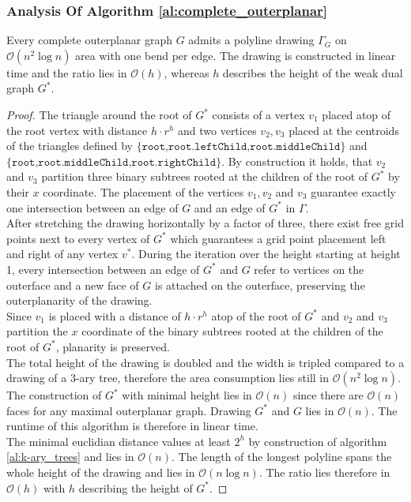 \subsubsection{Analysis Of Algorithm \ref{al:complete_outerplanar}}

\begin{lemma}
	Every complete outerplanar graph $G$ admits a polyline drawing $\Gamma_G$ on $\mathcal{O}(n^2 \log n)$ area with one bend per edge. The drawing is constructed in linear time and the ratio lies in $\mathcal{O}(h)$, whereas $h$ describes the height of the weak dual graph $G^*$.
\end{lemma}

\begin{proof}
The triangle around the root of $G^*$ consists of a vertex $v_1$ placed atop of the root vertex with distance $h\cdot r^h$ and two vertices $v_2,v_3$ placed at the centroids of the triangles defined by $\{\texttt{root,root.leftChild,root.middleChild}\}$ and $\{\texttt{root,root.middleChild,root.rightChild}\}$. By construction it holds, that $v_2$ and $v_3$ partition three binary subtrees rooted at the children of the root of $G^*$ by their $x$ coordinate. The placement of the vertices $v_1,v_2$ and $v_3$ guarantee exactly one intersection between an edge of $G$ and an edge of $G^*$ in $\Gamma$.\\
After stretching the drawing horizontally by a factor of three, there exist free grid points next to every vertex of $G^*$ which guarantees a grid point placement left and right of any vertex $v^*$. During the iteration over the height starting at height 1, every intersection between an edge of $G^*$ and $G$ refer to vertices on the outerface and a new face of $G$ is attached on the outerface, preserving the outerplanarity of the drawing.\\
Since $v_1$ is placed with a distance of $h\cdot r^h$ atop of the root of $G^*$ and $v_2$ and $v_3$ partition the $x$ coordinate of the binary subtrees rooted at the children of the root of $G^*$, planarity is preserved.\\
The total height of the drawing is doubled and the width is tripled compared to a drawing of a $3$-ary tree, therefore the area consumption lies still in $\mathcal{O}(n^2 \log n)$.\\
The construction of $G^*$ with minimal height lies in $\mathcal{O}(n)$ since there are $\mathcal{O}(n)$ faces for any maximal outerplanar graph. Drawing $G^*$ and $G$ lies in $\mathcal{O}(n)$. The runtime of this algorithm is therefore in linear time.\\
The minimal euclidian distance values at least $2^h$ by construction of algorithm \ref{al:k-ary_trees} and lies in $\mathcal{O}(n)$. The length of the longest polyline spans the whole height of the drawing and lies in $\mathcal{O}(n \log n)$. The ratio lies therefore in $\mathcal{O}(h)$ with $h$ describing the height of $G^*$.
\end{proof}
